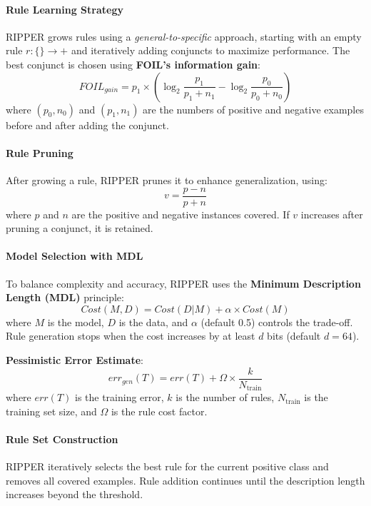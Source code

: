 \paragraph{Rule Learning Strategy}
RIPPER grows rules using a \textit{general-to-specific} approach, starting with an empty rule $r: \{\} \rightarrow +$ and iteratively adding conjuncts to maximize performance. The best conjunct is chosen using \textbf{FOIL's information gain}:
\begin{equation}
    FOIL_{gain} = p_1 \times \left( \log_2 \frac{p_1}{p_1 + n_1} - \log_2 \frac{p_0}{p_0 + n_0} \right)
\end{equation}
where $(p_0, n_0)$ and $(p_1, n_1)$ are the numbers of positive and negative examples before and after adding the conjunct.

\paragraph{Rule Pruning}
After growing a rule, RIPPER prunes it to enhance generalization, using:
\begin{equation}
    v = \frac{p - n}{p + n}
\end{equation}
where $p$ and $n$ are the positive and negative instances covered. If $v$ increases after pruning a conjunct, it is retained.

\paragraph{Model Selection with MDL}
To balance complexity and accuracy, RIPPER uses the \textbf{Minimum Description Length (MDL)} principle:
\begin{equation}
    Cost(M, D) = Cost(D|M) + \alpha \times Cost(M)
\end{equation}
where $M$ is the model, $D$ is the data, and $\alpha$ (default 0.5) controls the trade-off. Rule generation stops when the cost increases by at least $d$ bits (default $d = 64$).

\begin{definition}
\textbf{Pessimistic Error Estimate}:
\begin{equation}
    err_{gen}(T) = err(T) + \Omega \times \frac{k}{N_{\text{train}}}
\end{equation}
where $err(T)$ is the training error, $k$ is the number of rules, $N_{\text{train}}$ is the training set size, and $\Omega$ is the rule cost factor.
\end{definition}

\paragraph{Rule Set Construction}
RIPPER iteratively selects the best rule for the current positive class and removes all covered examples. Rule addition continues until the description length increases beyond the threshold.

